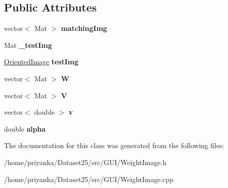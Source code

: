 \subsection*{\-Public \-Attributes}
\begin{DoxyCompactItemize}
\item 
\hypertarget{classWeightImage_aaca9acca67aadca4d8fa84d1c8d98490}{vector$<$ \-Mat $>$ {\bfseries matching\-Img}}\label{classWeightImage_aaca9acca67aadca4d8fa84d1c8d98490}

\item 
\hypertarget{classWeightImage_a4eaa7ea2349186695b204b8d2bc00915}{\-Mat {\bfseries \-\_\-test\-Img}}\label{classWeightImage_a4eaa7ea2349186695b204b8d2bc00915}

\item 
\hypertarget{classWeightImage_abf088bef022ae9533b835145c98512ea}{\hyperlink{classOrientedImage}{\-Oriented\-Image} {\bfseries test\-Img}}\label{classWeightImage_abf088bef022ae9533b835145c98512ea}

\item 
\hypertarget{classWeightImage_ad5eb5fe21dee1079c1b90e7d595e7860}{vector$<$ \-Mat $>$ {\bfseries \-W}}\label{classWeightImage_ad5eb5fe21dee1079c1b90e7d595e7860}

\item 
\hypertarget{classWeightImage_a84ec6c3e7d354edec8681cd1e35f8659}{vector$<$ \-Mat $>$ {\bfseries \-V}}\label{classWeightImage_a84ec6c3e7d354edec8681cd1e35f8659}

\item 
\hypertarget{classWeightImage_ac7a597c38f8209278d2e2423b3311dc8}{vector$<$ double $>$ {\bfseries v}}\label{classWeightImage_ac7a597c38f8209278d2e2423b3311dc8}

\item 
\hypertarget{classWeightImage_ad94bce97d6d2924aa8455fb3cf486292}{double {\bfseries alpha}}\label{classWeightImage_ad94bce97d6d2924aa8455fb3cf486292}

\end{DoxyCompactItemize}


\-The documentation for this class was generated from the following files\-:\begin{DoxyCompactItemize}
\item 
/home/priyanka/\-Dataset25/src/\-G\-U\-I/\-Weight\-Image.\-h\item 
/home/priyanka/\-Dataset25/src/\-G\-U\-I/\-Weight\-Image.\-cpp\end{DoxyCompactItemize}
